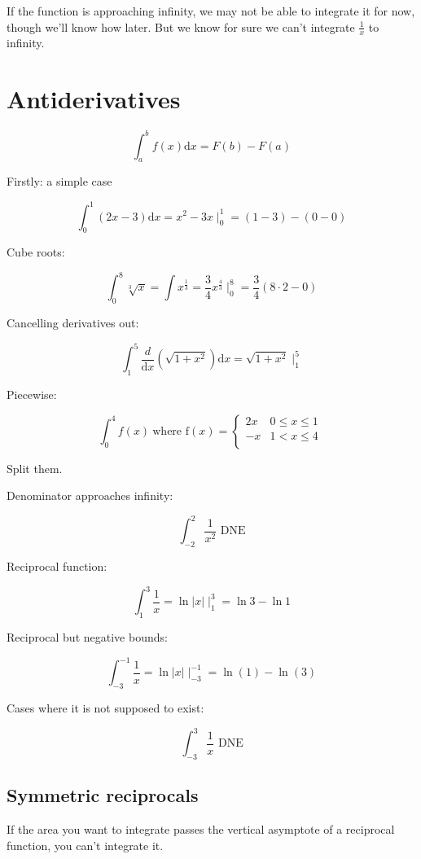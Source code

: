 \documentclass[12pt]{article}
\theoremstyle{plain}
\theoremstyle{remark}
\theoremstyle{definition}
\begin{document}
If the function is approaching infinity, we may not be able to integrate
it for now, though we'll know how later. But we know for sure we can't
integrate \(\frac{1}{x}\) to infinity.


\section{Antiderivatives}

\[\int_{a}^{b}{f(x)\text{d}x} = F(b) - F(a)\]

Firstly: a simple case

\[\int_{0}^{1}{(2x - 3)\text{d}x} = x^{2} - 3x \mid_{0}^{1} = (1 - 3) - (0 - 0)\]

Cube roots:

\[\int_{0}^{8}\sqrt[3]{x} = \int x^{\frac{1}{3}} = \frac{3}{4}x^{\frac{4}{3}} \mid_{0}^{8} = \frac{3}{4}(8 \cdot 2 - 0)\]

Cancelling derivatives out:

\[\int_{1}^{5}{\frac{d}{\text{d}x}\left( \sqrt{1 + x^{2}} \right)\text{d}x} = \sqrt{1 + x^{2}} \mid_{1}^{5}\]

Piecewise:

\[\int_{0}^{4}{f(x)}\ \text{where}\text{\ f}(x) = \left\{ \begin{matrix}
2x & 0 \leq x \leq 1 \\
 - x & 1 < x \leq 4 \\
\end{matrix} \right.\ \]

Split them.

Denominator approaches infinity:

\[\int_{- 2}^{2}\frac{1}{x^{2}}\text{\ DNE}\]

Reciprocal function:

\[\int_{1}^{3}\frac{1}{x} = \ln|x| \mid_{1}^{3} = \ln 3 - \ln 1\]

Reciprocal but negative bounds:

\[\int_{- 3}^{- 1}\frac{1}{x} = \ln|x| \mid_{- 3}^{- 1} = \ln(1) - \ln(3)\]

Cases where it is not supposed to exist:

\[\int_{- 3}^{3}\frac{1}{x}\text{\ DNE}\]


\subsection{Symmetric reciprocals}


If the area you want to integrate passes the vertical asymptote of a
reciprocal function, you can't integrate it.
\end{document}
